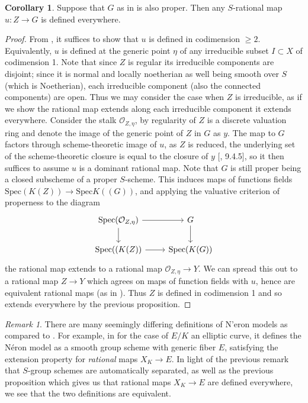 \documentclass{article}
\theoremstyle{definition}
\newtheorem{corollary}[theorem]{Corollary}
\theoremstyle{remark}
\newtheorem*{remark}{Remark}
\theoremstyle{plain}
\newcommand{\mc}[1]{\mathcal{#1}}
\begin{document}
\begin{corollary}\label{cor:weil-extension}
	Suppose that $G$ as in  is also proper. 
	Then any $S$-rational map $u: Z \to G$ is defined everywhere.
\end{corollary}

\begin{proof}
	From , it suffices to show that $u$ is defined in codimension $\geq 2$.
	Equivalently, $u$ is defined at the generic point $\eta$ of any irreducible subset $I \subset X$ of codimension 1.
	Note that since $Z$ is regular its irreducible components are disjoint; since it is normal and locally noetherian as well being smooth over $S$ (which is Noetherian), each irreducible component (also the connected components) are open. 
	Thus we may consider the case when $Z$ is irreducible, as if we show the rational map extends along each irreducible component it extends everywhere.\newline
\indent
	Consider the stalk $\mc{O}_{Z, \eta}$, by regularity of $Z$ is a discrete valuation ring and denote the image of the generic point of $Z$ in $G$ as $y$.
	The map to $G$ factors through scheme-theoretic image of $u$, as $Z$ is reduced, the underlying set of the scheme-theoretic closure is equal to the closure of $y$ [\cite{FOAG}, 9.4.5], so it then suffices to assume $u$ is a dominant rational map.	
	Note that $G$ is still proper being a closed subscheme of a proper $S$-scheme.
	This induces maps of functions fields $\text{Spec}(K(Z)) \to \text{Spec}K((G))$, and applying the valuative criterion of properness to the diagram
\[\begin{tikzcd}
	{\text{Spec}(\mc{O}_{Z, \eta})} & G \\
	{\text{Spec}((K(Z))} & {\text{Spec}(K(G))}
	\arrow[from=1-1, to=1-2]
	\arrow[from=1-1, to=2-1]
	\arrow[from=1-2, to=2-2]
	\arrow[from=2-1, to=2-2]
\end{tikzcd}\]
the rational map extends to a rational map $\mc{O}_{Z, \eta} \to Y$.
We can spread this out to a rational map $Z \to Y$ which agrees on maps of function fields with $u$, hence are equivalent rational maps (as in ).
Thus $Z$ is defined in codimension 1 and so extends everywhere by the previous proposition.
\end{proof}

\begin{remark}
	There are many seemingly differing definitions of N'eron models as compared to .
	For example, in \cite{AEC2} for the case of $E/K$ an elliptic curve, it defines the N\'eron model as a smooth group scheme with generic fiber $E$, satisfying the extension property for \textit{rational} maps $X_K \to E$.
		In light of the previous remark that $S$-group schemes are automatically separated, as well as the previous proposition which gives us that rational maps $X_K \to E$ are defined everywhere, we see that the two definitions are equivalent. 
\end{remark}
\end{document}
